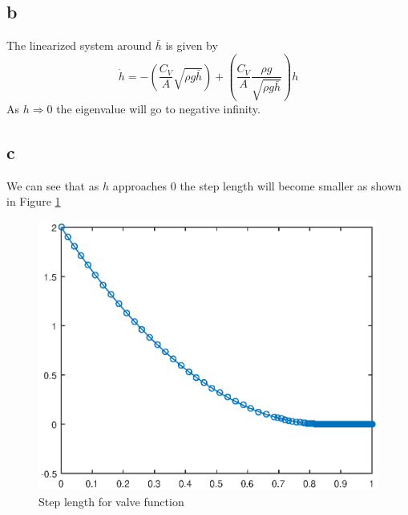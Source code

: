 \documentclass[11pt]{article}
\begin{document}
\subsection*{b}
The linearized system around $\bar{h}$ is given by
\[\dot{h} = - (\frac{C_V}{A} \sqrt{\rho g \bar{h}}) + (\frac{C_V}{A} \frac{\rho g}{\sqrt{\rho g \bar{h}}}) h \] 
As $h \Rightarrow 0$ the eigenvalue will go to negative infinity. 

\subsection*{c}
We can see that as $h$ approaches $0$ the step length will become smaller as shown in Figure \ref{fig:4c}

\begin{figure}[h!]
\centering
\includegraphics[width=.8\textwidth]{4c.eps}
\caption{Step length for valve function}
\label{fig:4c}
\end{figure}

              
\end{document}
